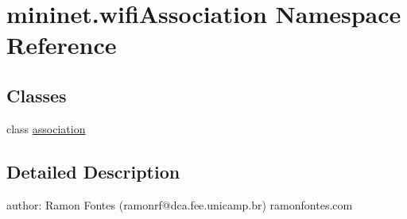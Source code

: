 \hypertarget{namespacemininet_1_1wifiAssociation}{\section{mininet.\-wifi\-Association Namespace Reference}
\label{namespacemininet_1_1wifiAssociation}
}
\subsection*{Classes}
\begin{DoxyCompactItemize}
\item 
class \hyperlink{classmininet_1_1wifiAssociation_1_1association}{association}
\end{DoxyCompactItemize}


\subsection{Detailed Description}
\begin{DoxyVerb}author: Ramon Fontes (ramonrf@dca.fee.unicamp.br)
ramonfontes.com\end{DoxyVerb}
 